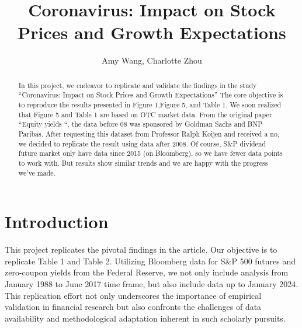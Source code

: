 \documentclass{article}
\title{Coronavirus: Impact on Stock Prices and Growth Expectations}
\author{Amy Wang, Charlotte Zhou}
\begin{document}
\maketitle
\begin{abstract}
  In this project, we endeavor to replicate and validate the 
findings in the study ``Coronavirus: Impact on Stock Prices and Growth Expectations''
 The core objective is to reproduce the results presented in Figure 1,Figure 5, and Table 1. We soon realized that 
 Figure 5 and Table 1 are based on OTC market data. From the original paper ``Equity yields ``, the data before 08 was sponsored by
 Goldman Sachs and BNP Paribas. After requesting this dataset from Professor Ralph Koijen and received a no, we decided
 to replicate the result using data after 2008. Of course, S&P dividend future market only have data since 2015 (on Bloomberg), so
 we have fewer data points to work with.  But results show similar trends and we are happy with the progress we've made. 
 
  \end{abstract}


\section{Introduction}
This project replicates the pivotal findings in the article. Our 
objective is to replicate Table 1 and Table 2. Utilizing Bloomberg 
data for S\&P 500 futures and zero-coupon yields from the Federal 
Reserve, we not only include analysis from January 1988 to June 
2017 time frame, but also include data up to January 2024. This 
replication effort not only underscores the importance of empirical 
validation in financial research but also confronts the challenges 
of data availability and methodological adaptation inherent in such 
scholarly pursuits.

\raggedright
\end{document}

